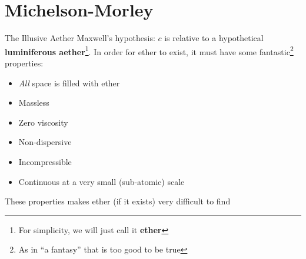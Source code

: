 \documentclass[12pt,compress,aspectratio=169]{beamer}
\begin{document}



\section{Michelson-Morley}

\begin{frame}{The Illusive Aether}
  Maxwell's hypothesis: $c$ is relative to a hypothetical \textbf{luminiferous
    aether}\footnote{For simplicity, we will just call it \textbf{ether}}. In
  order for ether to exist, it must have some fantastic\footnote{As in ``a
    fantasy'' that is too good to be true} properties:
  \begin{itemize}
  \item \emph{All} space is filled with ether
  \item Massless
  \item Zero viscosity
  \item Non-dispersive
  \item Incompressible
  \item Continuous at a very small (sub-atomic) scale
 \end{itemize}
  These properties makes ether (if it exists) very difficult to find
\end{frame}
\end{document}
